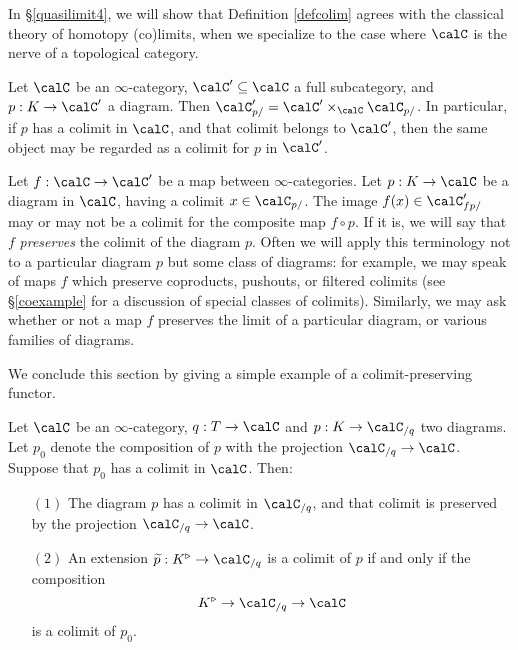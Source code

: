 \begin{remark}
In \S \ref{quasilimit4}, we will show
that Definition \ref{defcolim} agrees with the classical theory of homotopy (co)limits, when
we specialize to the case where $\calC$ is the nerve of a topological category.
\end{remark}

\begin{remark}
Let $\calC$ be an $\infty$-category, $\calC' \subseteq \calC$ a full subcategory,
and $p: K \rightarrow \calC'$ a diagram. Then $\calC'_{p/} = \calC' \times_{\calC}
\calC_{p/}$. In particular, if $p$ has a colimit in $\calC$, and that
colimit belongs to $\calC'$, then the same object may be regarded as a
colimit for $p$ in $\calC'$.
\end{remark}

Let $f: \calC \rightarrow \calC'$ be a map between $\infty$-categories. Let $p: K
\rightarrow \calC$ be a diagram in $\calC$, having a colimit $x \in \calC_{p/}$.
The image $f(x) \in \calC'_{f p/}$ may or may not be a colimit for the composite map
$f \circ p$. If it is, we will say that $f$ {\it preserves} the colimit of the diagram $p$.
Often we will apply this terminology not to a particular diagram $p$ but some class of diagrams: for example, we may speak of maps $f$ which
preserve coproducts, pushouts, or filtered colimits (see \S \ref{coexample} for a discussion of special classes of colimits). Similarly, we may ask whether or not a map $f$
preserves the limit of a particular diagram, or various families of diagrams.

We conclude this section by giving a simple example of a colimit-preserving functor.

\begin{proposition}\label{needed17}
Let $\calC$ be an $\infty$-category, $q: T \rightarrow \calC$ and $p: K \rightarrow \calC_{/q}$ two diagrams. Let $p_0$ denote the composition of $p$ with the projection 
$\calC_{/q} \rightarrow \calC$. Suppose that $p_0$ has a colimit in $\calC$. Then:
\begin{itemize}
\item[$(1)$] The diagram $p$ has a colimit in $\calC_{/q}$, and that colimit is preserved by the projection $\calC_{/q} \rightarrow \calC$.

\item[$(2)$] An extension $\widetilde{p}: K^{\triangleright} \rightarrow \calC_{/q}$ is a colimit
of $p$ if and only if the composition
$$K^{\triangleright} \rightarrow \calC_{/q} \rightarrow \calC$$
is a colimit of $p_0$.

\end{itemize}
\end{proposition}

